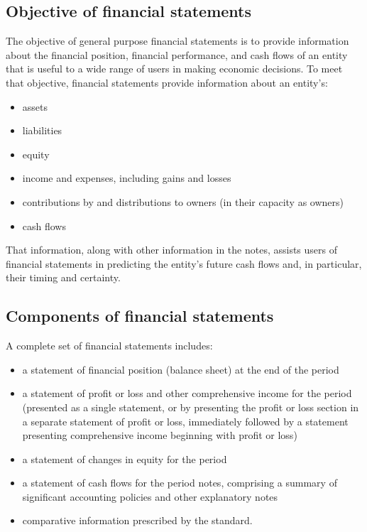\subsection{Objective of financial statements}
The objective of general purpose financial statements is to provide information about the financial position, financial performance, and cash flows of an entity that is useful to a wide range of users in making economic decisions. To meet that objective, financial statements provide information about an entity's:
\begin{itemize}
	\item assets 
	\item liabilities
	\item equity
	\item income and expenses, including gains and losses
	\item contributions by and distributions to owners (in their capacity as owners) 
	\item cash flows
\end{itemize}

That information, along with other information in the notes, assists users of financial statements in predicting the entity's future cash flows and, in particular, their timing and certainty.

\subsection{Components of financial statements}
A complete set of financial statements includes:
\begin{itemize}
	\item a statement of financial position (balance sheet) at the end of the period 
	\item a statement of profit or loss and other comprehensive income for the period (presented as a single statement, or by presenting the profit or loss section in a separate statement of profit or loss, immediately followed by a statement presenting comprehensive income beginning with profit or loss) 
	\item a statement of changes in equity for the period 
	\item a statement of cash flows for the period notes, comprising a summary of significant accounting policies and other explanatory notes 
	\item comparative information prescribed by the standard.
\end{itemize}

